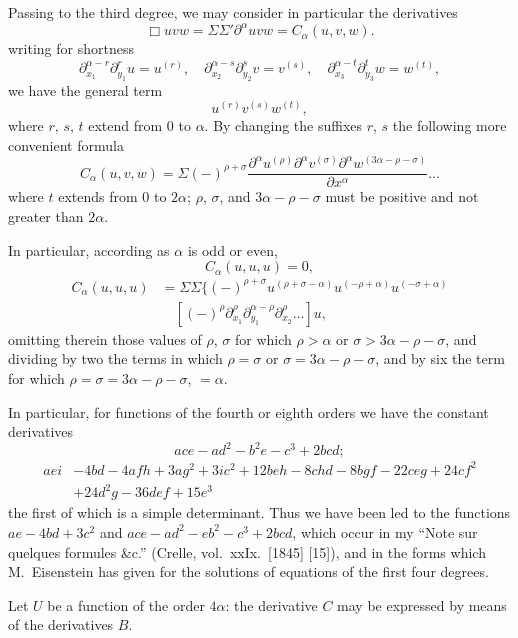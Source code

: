 \documentclass[11pt,a4paper]{book}
\begin{document}
\newpage
Passing to the third degree, we may consider in particular the derivatives
\[
\Box uvw = \Sigma \Sigma' \partial^{\alpha} uvw = C_{\alpha}(u, v, w).
\]
writing for shortness
\[
\partial_{x_1}^{\alpha - r} \partial_{y_1}^r u = u^{(r)}, \quad
\partial_{x_2}^{\alpha - s} \partial_{y_2}^s v = v^{(s)}, \quad
\partial_{x_3}^{\alpha - t} \partial_{y_3}^t w = w^{(t)},
\]
we have the general term
\[
u^{(r)} v^{(s)} w^{(t)},
\]
where $r$, $s$, $t$ extend from $0$ to $\alpha$. By changing the suffixes $r$, $s$ the following more
convenient formula
\[
C_{\alpha}(u, v, w) = \Sigma (-)^{\rho + \sigma} \frac{\partial^{\alpha} u^{(\rho)} \partial^{\alpha} v^{(\sigma)} \partial^{\alpha} w^{(3\alpha - \rho - \sigma)}}{\partial x^{\alpha}} \ldots
\]
where $t$ extends from $0$ to $2\alpha$; $\rho$, $\sigma$, and $3\alpha - \rho - \sigma$ must be positive and not greater
than $2\alpha$.

In particular, according as $\alpha$ is odd or even,
\[
C_{\alpha}(u, u, u) = 0,
\]
\begin{align*}
C_{\alpha}(u, u, u) &= \Sigma \Sigma \{(-)^{\rho + \sigma} u^{(\rho + \sigma - \alpha)} u^{(-\rho + \alpha)} u^{(-\sigma + \alpha)} \\
&\quad [(-)^{\rho} \partial_{x_1}^{\rho} \partial_{y_1}^{\alpha - \rho} \partial_{x_2}^{\rho} \ldots] u,
\end{align*}
omitting therein those values of $\rho$, $\sigma$ for which $\rho > \alpha$ or $\sigma > 3\alpha - \rho - \sigma$, and dividing by
two the terms in which $\rho = \sigma$ or $\sigma = 3\alpha - \rho - \sigma$, and by six the term for which
$\rho = \sigma = 3\alpha - \rho - \sigma$, $= \alpha$.

In particular, for functions of the fourth or eighth orders we have the constant
derivatives
\[
ace - ad^2 - b^2e - c^3 + 2bcd;
\]
\begin{align*}
aei &- 4bd - 4afh + 3ag^2 + 3ic^2 + 12beh - 8chd - 8bgf - 22ceg + 24cf^2 \\
&+ 24d^2g - 36def + 15e^3
\end{align*}
the first of which is a simple determinant. Thus we have been led to the functions
$ae - 4bd + 3c^2$ and $ace - ad^2 - eb^2 - c^3 + 2bcd$, which occur in my ``Note sur quelques
formules \&c.'' (Crelle, vol.~xxIx.\ [1845] [15]), and in the forms which M.~Eisenstein has
given for the solutions of equations of the first four degrees.

Let $U$ be a function of the order $4\alpha$: the derivative $C$ may be expressed by
means of the derivatives $B$.
\end{document}
